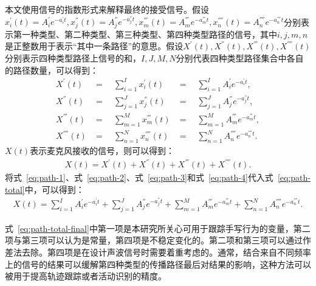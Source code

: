 本文使用信号的指数形式来解释最终的接受信号。假设$x_{i}^{'}(t)=A_{i}^{'}e^{-a_{i}^{'}t},x_{j}^{''}(t)=A_{j}^{''}e^{-a_{j}^{''}t},x_{m}^{'''}(t)=A_{m}^{'''}e^{-a_{m}^{'''}t},x_{n}^{''''}(t)=A_{n}^{''''}e^{-a_{n}^{''''}t}$分别表示第一种类型、第二种类型、第三种类型、第四种类型路径的信号，其中$i,j,m,n$是正整数用于表示“其中一条路径”的意思。假设$X^{'}(t),X^{''}(t),X^{'''}(t),X^{''''}(t)$分别表示四种类型路径上信号的和，$I,J,M,N$分别代表四种类型路径集合中各自的路径数量，可以得到：
\begin{eqnarray}
X^{'}(t) &=\quad  \sum_{i=1}^{I}x_{i}^{'}(t)      &=\quad   \sum_{i=1}^{I}A_{i}^{'}e^{-a_{i}^{'}t}, \\ \label{eq:path-1}
X^{''}(t) &=\quad  \sum_{j=1}^{J}x_{j}^{''}(t)     &=\quad  \sum_{j=1}^{J}A_{j}^{''}e^{-a_{j}^{''}t}, \\ \label{eq:path-2}
X^{'''}(t) &=\quad   \sum_{m=1}^{M}x_{m}^{'''}(t)    &=\quad   \sum_{m=1}^{M}A_{m}^{'''}e^{-a_{m}^{'''}t} ,\\ \label{eq:path-3}
X^{''''}(t) &=\quad   \sum_{n=1}^{N}x_{n}^{''''}(t)  &=\quad   \sum_{n=1}^{N}A_{n}^{''''}e^{-a_{n}^{''''}t}. \label{eq:path-4}
\end{eqnarray}
$X(t)$表示麦克风接收的信号，则可以得到：
\begin{equation}
\begin{aligned}
X(t)=X^{'}(t) + X^{''}(t) + X^{'''}(t)+ X^{''''}(t). \label{eq:path-total}
\end{aligned}
\end{equation}
将式~\ref{eq:path-1}、式~\ref{eq:path-2}、式~\ref{eq:path-3}和式~\ref{eq:path-4}代入式~\ref{eq:path-total}中，可以得到：
\begin{equation}
\begin{aligned}
X(t)=\sum_{i=1}^{I}A_{i}^{'}e^{-a_{i}^{'}t} + \sum_{j=1}^{J}A_{j}^{''}e^{-a_{j}^{''}t} +\sum_{m=1}^{M}A_{m}^{'''}e^{-a_{m}^{'''}t}+ \sum_{n=1}^{N}A_{n}^{''''}e^{-a_{n}^{''''}t}. \label{eq:path-total-final}
\end{aligned}
\end{equation}

式~\ref{eq:path-total-final}中第一项是本研究所关心可用于跟踪手写行为的变量，第二项与第三项可以认为是常量，第四项是不稳定变化的。第二项和第三项可以通过作差法去除。第四项是在设计声波信号时需要着重考虑的。通常，结合来自不同频率上的信号的结果可以缓解第四种类型的传播路径最后对结果的影响，这种方法可以被用于提高轨迹跟踪或者活动识别的精度。

